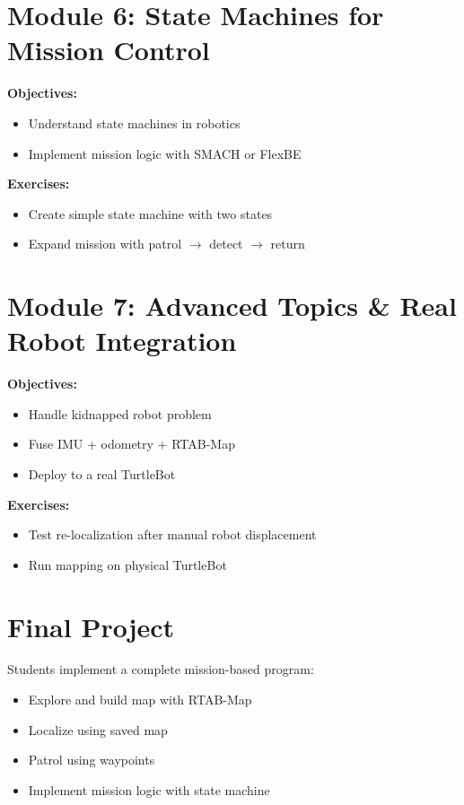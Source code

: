 \documentclass{article}
\begin{document}
\section{Module 6: State Machines for Mission Control}
\textbf{Objectives:}
\begin{itemize}
  \item Understand state machines in robotics
  \item Implement mission logic with SMACH or FlexBE
\end{itemize}
\textbf{Exercises:}
\begin{itemize}
  \item Create simple state machine with two states
  \item Expand mission with patrol $\rightarrow$ detect $\rightarrow$ return
\end{itemize}

\section{Module 7: Advanced Topics \& Real Robot Integration}
\textbf{Objectives:}
\begin{itemize}
  \item Handle kidnapped robot problem
  \item Fuse IMU + odometry + RTAB-Map
  \item Deploy to a real TurtleBot
\end{itemize}
\textbf{Exercises:}
\begin{itemize}
  \item Test re-localization after manual robot displacement
  \item Run mapping on physical TurtleBot
\end{itemize}

\section*{Final Project}
Students implement a complete mission-based program:
\begin{itemize}
  \item Explore and build map with RTAB-Map
  \item Localize using saved map
  \item Patrol using waypoints
  \item Implement mission logic with state machine
\end{itemize}
\end{document}
